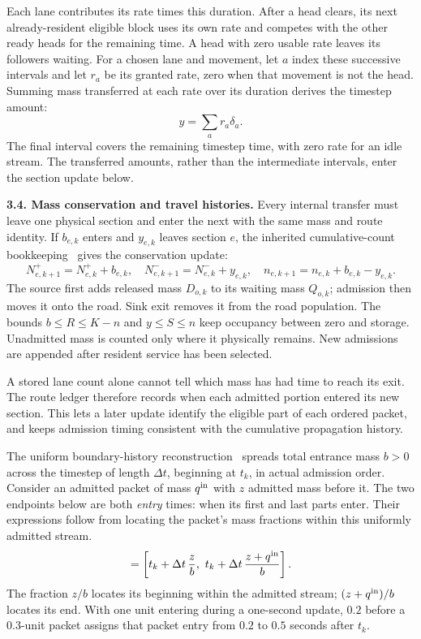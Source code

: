 \documentclass[10pt,a4paper]{article}
\begin{document}
Each lane contributes its rate times this duration. After a head clears,
its next already-resident eligible block uses its own rate and competes
with the other ready heads for the remaining time. A head with zero
usable rate leaves its followers waiting. For a chosen lane and movement,
let $a$ index these successive intervals and let $r_a$ be its granted
rate, zero when that movement is not the head.
Summing mass transferred at each rate over its duration derives the timestep amount:
\begin{equation}
 y=\sum_a r_a\delta_a.
 \label{eq:compact-service-amount}
\end{equation}
The final interval covers the remaining timestep time, with zero rate
for an idle stream. The transferred amounts, rather than the intermediate
intervals, enter the section update below.
\par

\textbf{3.4. Mass conservation and travel histories.}
Every internal transfer must leave one physical section and enter the
next with the same mass and route identity. If $b_{e,k}$ enters and
$y_{e,k}$ leaves section $e$,
the inherited cumulative-count bookkeeping~\cite{m0,m1} gives the conservation update:
\begin{equation}
 N^+_{e,k+1}=N^+_{e,k}+b_{e,k},\quad
 N^-_{e,k+1}=N^-_{e,k}+y_{e,k},\quad
 n_{e,k+1}=n_{e,k}+b_{e,k}-y_{e,k}.
 \label{eq:compact-update}
\end{equation}
The source first adds released mass $D_{o,k}$ to its waiting mass $Q_{o,k}$;
admission then moves it onto the road. Sink exit removes it from the
road population. The bounds $b\leq R\leq K-n$ and $y\leq S\leq n$
keep occupancy between zero and storage. Unadmitted mass is counted
only where it physically remains. New admissions are appended after
resident service has been selected.


A stored lane count alone cannot tell which mass has had time to reach
its exit. The route ledger therefore records when each admitted portion
entered its new section. This lets a later update identify the eligible
part of each ordered packet, and keeps admission timing consistent with
the cumulative propagation history.

The uniform boundary-history reconstruction~\cite{m1} spreads total
entrance mass $b>0$ across the timestep of length $\Delta t$, beginning at
$t_k$, in actual admission order. Consider an admitted packet of mass
$q^{\rm in}$ with $z$ admitted mass before it. The two endpoints below
are both \emph{entry} times: when its first and last parts enter.
Their expressions follow from locating the packet's mass fractions within this uniformly admitted stream.
\begin{equation}
 [t^{\rm in}_{\rm front},t^{\rm in}_{\rm tail}]
 =\left[t_k+\Delta t\,\frac z b,\
       t_k+\Delta t\,\frac{z+q^{\rm in}}b\right].
 \label{eq:compact-entry}
\end{equation}
The fraction $z/b$ locates its beginning within the admitted stream;
$(z+q^{\rm in})/b$ locates its end. With one unit entering during a
one-second update, $0.2$ before a $0.3$-unit packet assigns that packet
entry from $0.2$ to $0.5$ seconds after $t_k$.
\end{document}
